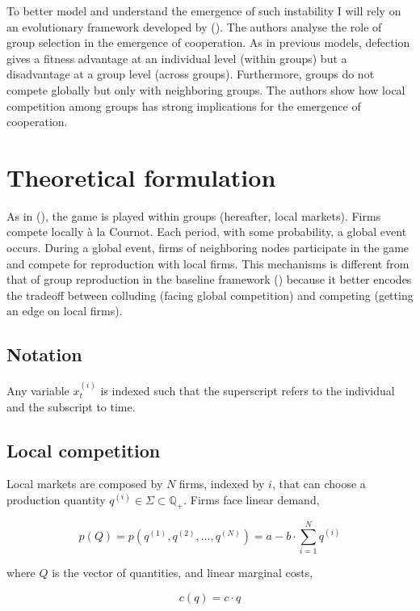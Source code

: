 \documentclass[american]{scrartcl}
\newcommand{\Rat}{\mathbb{Q}}
\newcommand{\citein}[1]{\citeauthor{#1} (\citeyear{#1})}
\begin{document}
To better model and understand the emergence of such instability I will rely on an evolutionary framework developed by \citein{Akdeniz2020}. The authors analyse the role of group selection in the emergence of cooperation. As in previous models, defection gives a fitness advantage at an individual level (within groups) but a disadvantage at a group level (across groups). Furthermore, groups do not compete globally but only with neighboring groups. The authors show how local competition among groups has strong implications for the emergence of cooperation.

\section{Theoretical formulation}

As in \citein{Akdeniz2020}, the game is played within groups (hereafter, local markets). Firms compete locally à la Cournot. Each period, with some probability, a global event occurs. During a global event, firms of neighboring nodes participate in the game and compete for reproduction with local firms. This mechanisms is different from that of group reproduction in the baseline framework (\cite{Akdeniz2020}) because it better encodes the tradeoff between colluding (facing global competition) and competing (getting an edge on local firms).

\subsection{Notation}

Any variable $x^{(i)}_t$ is indexed such that the superscript refers to the individual and the subscript to time.

\subsection{Local competition}

Local markets are composed by $N$ firms, indexed by $i$, that can choose a production quantity $q^{(i)} \in \Sigma \subset \Rat_+$. Firms face linear demand,

\begin{equation}
    p(Q) = p\left(q^{(1)}, q^{(2)},  \ldots, q^{(N)} \right) = a - b \cdot \sum^{N}_{i=1} q^{(i)}
\end{equation}

where $Q$ is the vector of quantities, and linear marginal costs,

\begin{equation}
    c(q) = c \cdot q
\end{equation}
\end{document}
